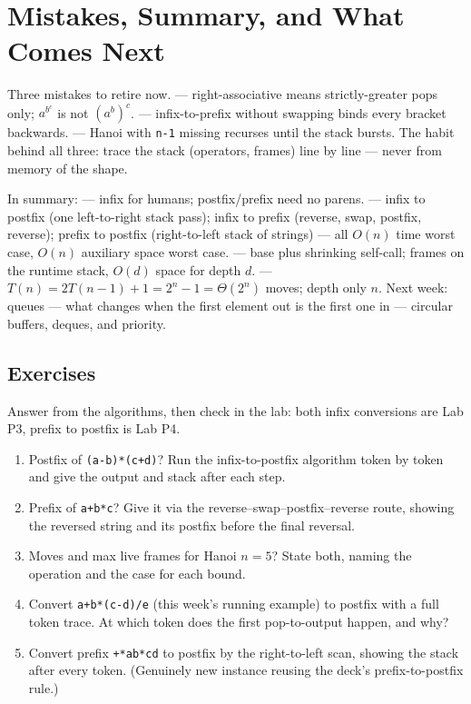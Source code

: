 \documentclass[11pt]{article}
\begin{document}
\section{Mistakes, Summary, and What Comes Next}

Three mistakes to retire now.  --- right-associative means strictly-greater pops only; $a^{b^{c}}$ is not $(a^{b})^{c}$.  --- infix-to-prefix without swapping binds every bracket backwards.  --- Hanoi with \texttt{n-1} missing recurses until the stack bursts. The habit behind all three: trace the stack (operators, frames) line by line --- never from memory of the shape.

In summary:  --- infix for humans; postfix/prefix need no parens.  --- infix to postfix (one left-to-right stack pass); infix to prefix (reverse, swap, postfix, reverse); prefix to postfix (right-to-left stack of strings) --- all $O(n)$ time worst case, $O(n)$ auxiliary space worst case.  --- base plus shrinking self-call; frames on the runtime stack, $O(d)$ space for depth $d$.  --- $T(n) = 2T(n-1) + 1 = 2^{n} - 1 = \Theta(2^{n})$ moves; depth only $n$. Next week: queues --- what changes when the first element out is the first one in --- circular buffers, deques, and priority.

\subsection*{Exercises}

Answer from the algorithms, then check in the lab: both infix conversions are Lab P3, prefix to postfix is Lab P4.
\begin{enumerate}
  \item Postfix of \texttt{(a-b)*(c+d)}? Run the infix-to-postfix algorithm token by token and give the output and stack after each step.
  \item Prefix of \texttt{a+b*c}? Give it via the reverse--swap--postfix--reverse route, showing the reversed string and its postfix before the final reversal.
  \item Moves and max live frames for Hanoi $n = 5$? State both, naming the operation and the case for each bound.
  \item Convert \texttt{a+b*(c-d)/e} (this week's running example) to postfix with a full token trace. At which token does the first pop-to-output happen, and why?
  \item Convert prefix \texttt{+*ab*cd} to postfix by the right-to-left scan, showing the stack after every token. (Genuinely new instance reusing the deck's prefix-to-postfix rule.)
\end{enumerate}
\end{document}
